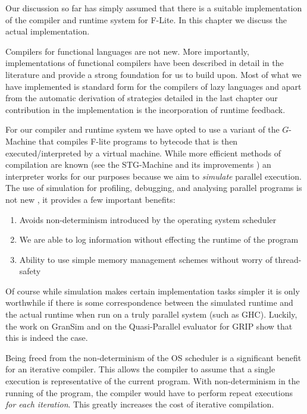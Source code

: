 Our discussion so far has simply assumed that there is a suitable implementation
of the compiler and runtime system for F-Lite. In this chapter we discuss the
actual implementation.

Compilers for functional languages are not new. More importantly,
implementations of functional compilers have been described in detail in the
literature and provide a strong foundation for us to build upon. Most of what
we have implemented is standard form for the compilers of lazy languages and
apart from the automatic derivation of strategies detailed in the last chapter
our contribution in the implementation is the incorporation of runtime
feedback.

For our compiler and runtime system we have opted to use a variant of the
$G$-Machine  that compiles F-lite programs to bytecode that is
then executed/interpreted by a virtual machine. While more efficient methods of
compilation are known (see the STG-Machine and its improvements ) an interpreter works for our purposes because we aim
to \emph{simulate} parallel execution. The use of simulation for profiling,
debugging, and analysing parallel programs is not new , it provides a few important benefits:

\begin{enumerate}
    \item Avoids non-determinism introduced by the operating system scheduler
    \item We are able to log information without effecting the runtime of the
            program
    \item Ability to use simple memory management schemes without worry of
            thread-safety
\end{enumerate}

Of course while simulation makes certain implementation tasks simpler it is
only worthwhile if there is some correspondence between the simulated runtime
and the actual runtime when run on a truly parallel system (such as GHC).
Luckily, the work on GranSim and on the Quasi-Parallel evaluator for GRIP
 show that this is indeed the case.

Being freed from the non-determinism of the OS scheduler is a significant
benefit for an iterative compiler. This allows the compiler to assume that a
single execution is representative of the current program. With non-determinism
in the running of the program, the compiler would have to perform repeat
executions \emph{for each iteration}.  This greatly increases the cost of
iterative compilation.

